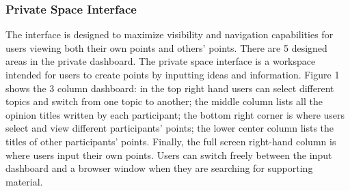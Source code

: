 \documentclass{sigchi}
\begin{document}
\subsubsection{Private Space Interface}

The interface is designed to maximize visibility and navigation capabilities for users viewing both their own points and others' points. There are 5 designed areas in the private dashboard. The private space interface is a workspace intended for users to create points by inputting ideas and information. Figure 1 shows the 3 column dashboard: in the top right hand users can select different topics and switch from one topic to another; the middle column lists all the opinion titles written by each participant; the bottom right corner is where users select and view different participants' points; the lower center column lists the titles of other participants' points. Finally, the full screen right-hand column is where users input their own points. Users can switch freely between the input dashboard and a browser window when they are searching for supporting material.
\end{document}

